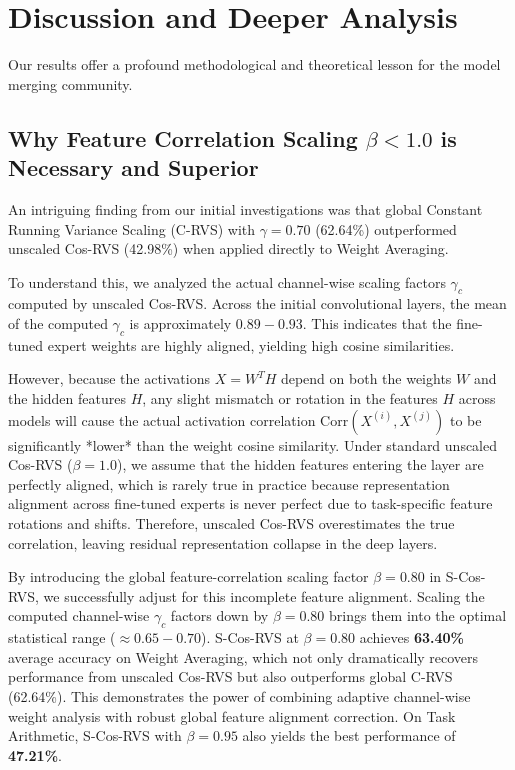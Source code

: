 \documentclass{article}
\theoremstyle{plain}
\theoremstyle{definition}
\theoremstyle{remark}
\begin{document}
\section{Discussion and Deeper Analysis}
\label{sec:discussion}

Our results offer a profound methodological and theoretical lesson for the model merging community. 

\subsection{Why Feature Correlation Scaling $\beta < 1.0$ is Necessary and Superior}

An intriguing finding from our initial investigations was that global Constant Running Variance Scaling (C-RVS) with $\gamma=0.70$ (62.64\%) outperformed unscaled Cos-RVS (42.98\%) when applied directly to Weight Averaging.

To understand this, we analyzed the actual channel-wise scaling factors $\gamma_c$ computed by unscaled Cos-RVS. Across the initial convolutional layers, the mean of the computed $\gamma_c$ is approximately $0.89 - 0.93$. This indicates that the fine-tuned expert weights are highly aligned, yielding high cosine similarities. 

However, because the activations $X = W^T H$ depend on both the weights $W$ and the hidden features $H$, any slight mismatch or rotation in the features $H$ across models will cause the actual activation correlation $\text{Corr}(X^{(i)}, X^{(j)})$ to be significantly *lower* than the weight cosine similarity. Under standard unscaled Cos-RVS ($\beta=1.0$), we assume that the hidden features entering the layer are perfectly aligned, which is rarely true in practice because representation alignment across fine-tuned experts is never perfect due to task-specific feature rotations and shifts. Therefore, unscaled Cos-RVS overestimates the true correlation, leaving residual representation collapse in the deep layers.

By introducing the global feature-correlation scaling factor $\beta=0.80$ in S-Cos-RVS, we successfully adjust for this incomplete feature alignment. Scaling the computed channel-wise $\gamma_c$ factors down by $\beta=0.80$ brings them into the optimal statistical range ($\approx 0.65 - 0.70$). S-Cos-RVS at $\beta=0.80$ achieves \textbf{63.40\%} average accuracy on Weight Averaging, which not only dramatically recovers performance from unscaled Cos-RVS but also outperforms global C-RVS (62.64\%). This demonstrates the power of combining adaptive channel-wise weight analysis with robust global feature alignment correction. On Task Arithmetic, S-Cos-RVS with $\beta=0.95$ also yields the best performance of \textbf{47.21\%}.
\end{document}
